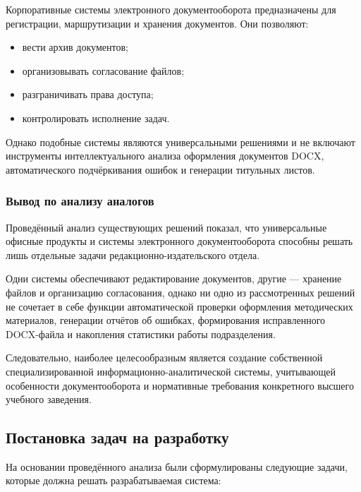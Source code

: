 Корпоративные системы электронного документооборота предназначены для регистрации, маршрутизации и хранения документов. Они позволяют:

\begin{itemize}
	\item вести архив документов;
	\item организовывать согласование файлов;
	\item разграничивать права доступа;
	\item контролировать исполнение задач.
\end{itemize}

Однако подобные системы являются универсальными решениями и не включают инструменты интеллектуального анализа оформления документов DOCX, автоматического подчёркивания ошибок и генерации титульных листов.

\subsubsection{Вывод по анализу аналогов}

Проведённый анализ существующих решений показал, что универсальные офисные продукты и системы электронного документооборота способны решать лишь отдельные задачи редакционно-издательского отдела.

Одни системы обеспечивают редактирование документов, другие --- хранение файлов и организацию согласования, однако ни одно из рассмотренных решений не сочетает в себе функции автоматической проверки оформления методических материалов, генерации отчётов об ошибках, формирования исправленного DOCX-файла и накопления статистики работы подразделения.

Следовательно, наиболее целесообразным является создание собственной специализированной информационно-аналитической системы, учитывающей особенности документооборота и нормативные требования конкретного высшего учебного заведения.

\subsection{Постановка задач на разработку}

На основании проведённого анализа были сформулированы следующие задачи, которые должна решать разрабатываемая система:

